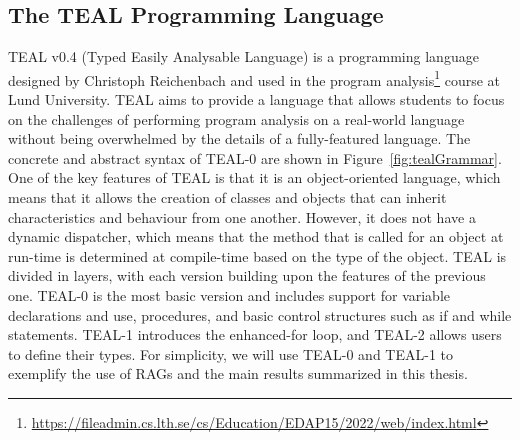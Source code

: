 \subsection{The TEAL Programming Language}
\label{sec:teal}
TEAL v0.4 (Typed Easily Analysable Language) is a programming language designed by Christoph Reichenbach and used in the
program analysis\footnote{\url{https://fileadmin.cs.lth.se/cs/Education/EDAP15/2022/web/index.html}} course at Lund University.
TEAL aims to provide a language that allows students to
focus on the challenges of performing program analysis on a real-world language
without being overwhelmed by the details of a fully-featured language.
The concrete and abstract syntax of TEAL-0 are shown in Figure~\ref{fig:tealGrammar}.
One of the key features of TEAL is that it is an object-oriented language,
which means that it allows the creation of classes and objects that can inherit
characteristics and behaviour from one another. However, it does not have a dynamic
dispatcher, which means that the method that is called for an object at run-time
is determined at compile-time based on the type of the object.
TEAL is divided in layers, with each version building
upon the features of the previous one. TEAL-0 is the most basic version and includes
support for variable declarations and use, procedures, and basic control structures such as if
and while statements. TEAL-1 introduces the enhanced-for loop, and TEAL-2 allows users to
define their types.
For simplicity, we will use TEAL-0 and TEAL-1 to exemplify the use of RAGs
and the main results summarized in this thesis.
\newsavebox{\mylistingbox}

